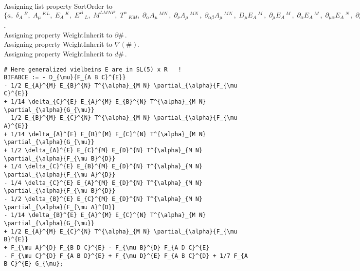 \documentclass[11pt]{article}
\begin{document}
\\
Assigning list property SortOrder to $\{a,\; {\delta}_{A}\,^{B},\; {A}_{\mu}\,^{K L},\; {E}_{A}\,^{K},\; {E}^{B}\,_{L},\; {M}^{L M N P},\; {T}^{\alpha}\,_{K M},\; {\partial}_{\alpha}{{A}_{\mu}\,^{M N}}\, ,\; {\partial}_{\nu}{{A}_{\mu}\,^{M N}}\, ,\; {\partial}_{\alpha \beta}{{A}_{\mu}\,^{M N}}\, ,\; {D}_{\mu}{{E}_{A}\,^{M}}\, ,\; {\partial}_{\mu}{{E}_{A}\,^{M}}\, ,\; {\partial}_{\alpha}{{E}_{A}\,^{M}}\, ,\; {\partial}_{\mu \alpha}{{E}_{A}\,^{N}}\, ,\; {\partial}_{\alpha}{e}\, ,\; {D}_{\mu}{e}\, \}$.
\\
Assigning property WeightInherit to $\partial{\#}\, $.
\\
Assigning property WeightInherit to $\nabla(\#)$.
\\
Assigning property WeightInherit to $d{\#}\, $.
\\
{\color[named]{Blue}\begin{verbatim}
# Here generalized vielbeins E are in SL(5) x R   !
BIFABCE := - D_{\mu}{F_{A B C}^{E}} 
- 1/2 E_{A}^{M} E_{B}^{N} T^{\alpha}_{M N} \partial_{\alpha}{F_{\mu C}^{E}} 
+ 1/14 \delta_{C}^{E} E_{A}^{M} E_{B}^{N} T^{\alpha}_{M N} \partial_{\alpha}{G_{\mu}} 
- 1/2 E_{B}^{M} E_{C}^{N} T^{\alpha}_{M N} \partial_{\alpha}{F_{\mu A}^{E}} 
+ 1/14 \delta_{A}^{E} E_{B}^{M} E_{C}^{N} T^{\alpha}_{M N} \partial_{\alpha}{G_{\mu}} 
+ 1/2 \delta_{A}^{E} E_{C}^{M} E_{D}^{N} T^{\alpha}_{M N} \partial_{\alpha}{F_{\mu B}^{D}} 
+ 1/4 \delta_{C}^{E} E_{B}^{M} E_{D}^{N} T^{\alpha}_{M N} \partial_{\alpha}{F_{\mu A}^{D}} 
- 1/4 \delta_{C}^{E} E_{A}^{M} E_{D}^{N} T^{\alpha}_{M N} \partial_{\alpha}{F_{\mu B}^{D}} 
- 1/2 \delta_{B}^{E} E_{C}^{M} E_{D}^{N} T^{\alpha}_{M N} \partial_{\alpha}{F_{\mu A}^{D}} 
- 1/14 \delta_{B}^{E} E_{A}^{M} E_{C}^{N} T^{\alpha}_{M N} \partial_{\alpha}{G_{\mu}} 
+ 1/2 E_{A}^{M} E_{C}^{N} T^{\alpha}_{M N} \partial_{\alpha}{F_{\mu B}^{E}} 
+ F_{\mu A}^{D} F_{B D C}^{E} - F_{\mu B}^{D} F_{A D C}^{E} 
- F_{\mu C}^{D} F_{A B D}^{E} + F_{\mu D}^{E} F_{A B C}^{D} + 1/7 F_{A B C}^{E} G_{\mu};
\end{verbatim}}
\end{document}
